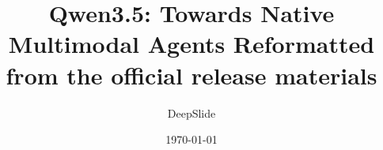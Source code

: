 \title{Qwen3.5: Towards Native Multimodal Agents Reformatted from the official release materials}
\author{DeepSlide}
\date{\today}